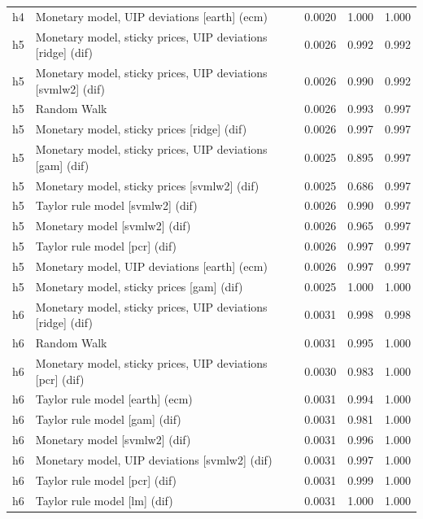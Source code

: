 \begin{ThreePartTable}
\begin{longtable}[t]{cp{5.5cm}ccc}
h4 & \raggedright Monetary model, UIP deviations [earth] (ecm) & 0.0020 & 1.000 & 1.000\\
\addlinespace
h5 & \raggedright Monetary model, sticky prices, UIP deviations [ridge] (dif) & 0.0026 & 0.992 & 0.992\\
h5 & \raggedright Monetary model, sticky prices, UIP deviations [svmlw2] (dif) & 0.0026 & 0.990 & 0.992\\
h5 & \raggedright Random Walk & 0.0026 & 0.993 & 0.997\\
h5 & \raggedright Monetary model, sticky prices [ridge] (dif) & 0.0026 & 0.997 & 0.997\\
h5 & \raggedright Monetary model, sticky prices, UIP deviations [gam] (dif) & 0.0025 & 0.895 & 0.997\\
h5 & \raggedright Monetary model, sticky prices [svmlw2] (dif) & 0.0025 & 0.686 & 0.997\\
h5 & \raggedright Taylor rule model [svmlw2] (dif) & 0.0026 & 0.990 & 0.997\\
h5 & \raggedright Monetary model [svmlw2] (dif) & 0.0026 & 0.965 & 0.997\\
h5 & \raggedright Taylor rule model [pcr] (dif) & 0.0026 & 0.997 & 0.997\\
h5 & \raggedright Monetary model, UIP deviations [earth] (ecm) & 0.0026 & 0.997 & 0.997\\
h5 & \raggedright Monetary model, sticky prices [gam] (dif) & 0.0025 & 1.000 & 1.000\\
\addlinespace
h6 & \raggedright Monetary model, sticky prices, UIP deviations [ridge] (dif) & 0.0031 & 0.998 & 0.998\\
h6 & \raggedright Random Walk & 0.0031 & 0.995 & 1.000\\
h6 & \raggedright Monetary model, sticky prices, UIP deviations [pcr] (dif) & 0.0030 & 0.983 & 1.000\\
h6 & \raggedright Taylor rule model [earth] (ecm) & 0.0031 & 0.994 & 1.000\\
h6 & \raggedright Taylor rule model [gam] (dif) & 0.0031 & 0.981 & 1.000\\
h6 & \raggedright Monetary model [svmlw2] (dif) & 0.0031 & 0.996 & 1.000\\
h6 & \raggedright Monetary model, UIP deviations [svmlw2] (dif) & 0.0031 & 0.997 & 1.000\\
h6 & \raggedright Taylor rule model [pcr] (dif) & 0.0031 & 0.999 & 1.000\\
h6 & \raggedright Taylor rule model [lm] (dif) & 0.0031 & 1.000 & 1.000\\

\end{longtable}
\end{ThreePartTable}
